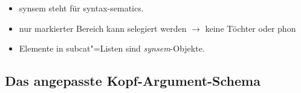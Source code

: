 {\begin{itemize}
\item {\sc synsem} steht für {\sc syntax-sematics}.

\item nur markierter Bereich kann selegiert werden $\to$ keine Töchter oder {\sc phon}

\item Elemente in {\sc subcat}"=Listen sind {\it synsem\/}-Objekte.
\end{itemize}
}

\subsection{Das angepasste Kopf-Argument-Schema}


